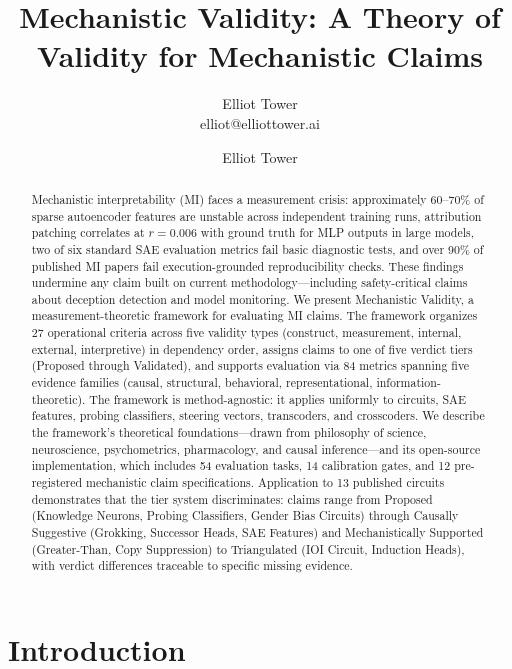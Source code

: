 \documentclass[10pt]{article}
\title{Mechanistic Validity: A Theory of Validity for Mechanistic Claims}
\author{\name Elliot Tower \\
        \email elliot@elliottower.ai}
\author[1]{Elliot Tower}
\affil[1]{\texttt{elliot@elliottower.ai}}
\date{}
\begin{document}
\maketitle

\begin{abstract}
Mechanistic interpretability (MI) faces a measurement crisis: approximately 60--70\% of sparse autoencoder features are unstable across independent training runs, attribution patching correlates at $r = 0.006$ with ground truth for MLP outputs in large models, two of six standard SAE evaluation metrics fail basic diagnostic tests, and over 90\% of published MI papers fail execution-grounded reproducibility checks. These findings undermine any claim built on current methodology---including safety-critical claims about deception detection and model monitoring. We present Mechanistic Validity, a measurement-theoretic framework for evaluating MI claims. The framework organizes 27 operational criteria across five validity types (construct, measurement, internal, external, interpretive) in dependency order, assigns claims to one of five verdict tiers (Proposed through Validated), and supports evaluation via 84 metrics spanning five evidence families (causal, structural, behavioral, representational, information-theoretic). The framework is method-agnostic: it applies uniformly to circuits, SAE features, probing classifiers, steering vectors, transcoders, and crosscoders. We describe the framework's theoretical foundations---drawn from philosophy of science, neuroscience, psychometrics, pharmacology, and causal inference---and its open-source implementation, which includes 54 evaluation tasks, 14 calibration gates, and 12 pre-registered mechanistic claim specifications. Application to 13 published circuits demonstrates that the tier system discriminates: claims range from Proposed (Knowledge Neurons, Probing Classifiers, Gender Bias Circuits) through Causally Suggestive (Grokking, Successor Heads, SAE Features) and Mechanistically Supported (Greater-Than, Copy Suppression) to Triangulated (IOI Circuit, Induction Heads), with verdict differences traceable to specific missing evidence.
\end{abstract}

\section{Introduction}
\label{sec:intro}
\end{document}
